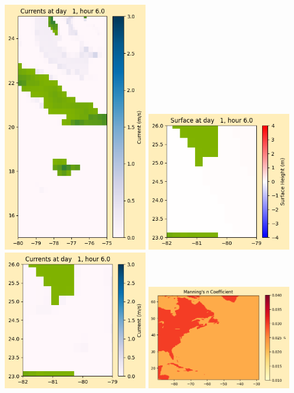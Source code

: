 \documentclass[11pt]{article}
\begin{document}
\includegraphics[width=0.475\textwidth]{frame0017fig1008.png}
\vskip 10pt 
\includegraphics[width=0.475\textwidth]{frame0017fig1009.png}
\includegraphics[width=0.475\textwidth]{frame0017fig1010.png}
\vskip 10pt 
\includegraphics[width=0.475\textwidth]{frame0017fig1011.png}
\end{document}
